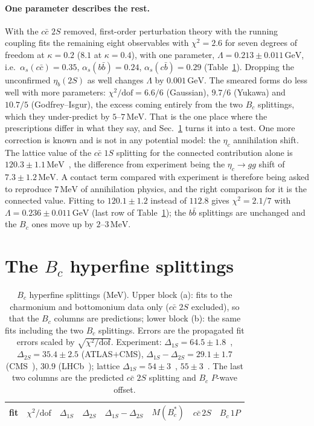 \documentclass[10pt,twocolumn]{article}
\newcommand{\Bc}{B_c}
\newcommand{\Bcs}{B_c^*}
\newcommand{\cc}{c\bar c}
\newcommand{\bb}{b\bar b}
\newcommand{\cb}{c\bar b}
\newcommand{\MeV}{\,\mathrm{MeV}}
\newcommand{\GeV}{\,\mathrm{GeV}}
\begin{document}
\paragraph{One parameter describes the rest.}
With the $\cc$ $2S$ removed, first-order perturbation theory with the running coupling fits the remaining eight observables with $\chi^2=2.6$ for seven degrees of freedom at $\kappa=0.2$ ($8.1$ at $\kappa=0.4$), with one parameter, $\Lambda=0.213\pm0.011\GeV$, i.e.\ $\alpha_s(\cc)=0.35$, $\alpha_s(\bb)=0.24$, $\alpha_s(\cb)=0.29$ (Table~\ref{tab:bc}).
Dropping the unconfirmed $\eta_b(2S)$ as well changes $\Lambda$ by $0.001\GeV$.
The smeared forms do less well with more parameters: $\chi^2/\mathrm{dof}=6.6/6$ (Gaussian), $9.7/6$ (Yukawa) and $10.7/5$ (Godfrey--Isgur), the excess coming entirely from the two $\Bc$ splittings, which they under-predict by $5$--$7\MeV$.
That is the one place where the prescriptions differ in what they say, and Sec.~\ref{sec:bc} turns it into a test.
One more correction is known and is not in any potential model: the $\eta_c$ annihilation shift.
The lattice value of the $\cc$ $1S$ splitting for the connected contribution alone is $120.3\pm1.1\MeV$~\cite{Hatton2020}, the difference from experiment being the $\eta_c\to gg$ shift of $7.3\pm1.2\MeV$.
A contact term compared with experiment is therefore being asked to reproduce $7\MeV$ of annihilation physics, and the right comparison for it is the connected value.
Fitting to $120.1\pm1.2$ instead of $112.8$ gives $\chi^2=2.1/7$ with $\Lambda=0.236\pm0.011\GeV$ (last row of Table~\ref{tab:bc}); the $\bb$ splittings are unchanged and the $\Bc$ ones move up by $2$--$3\MeV$.

\section{The $\Bc$ hyperfine splittings}
\label{sec:bc}

\begin{table}[t]
\caption{$\Bc$ hyperfine splittings (MeV). Upper block (a): fits to the charmonium and bottomonium data only ($\cc$ $2S$ excluded), so that the $\Bc$ columns are predictions; lower block (b): the same fits including the two $\Bc$ splittings. Errors are the propagated fit errors scaled by $\sqrt{\chi^2/\mathrm{dof}}$. Experiment: $\Delta_{1S}=64.5\pm1.8$~\cite{ATLAS2026}, $\Delta_{2S}=35.4\pm2.5$ (ATLAS$+$CMS), $\Delta_{1S}-\Delta_{2S}=29.1\pm1.7$ (CMS~\cite{CMS2019}), $30.9$ (LHCb~\cite{LHCb2019}); lattice $\Delta_{1S}=54\pm3$~\cite{Dowdall2012}, $55\pm3$~\cite{Mathur2018}. The last two columns are the predicted $\cc$ $2S$ splitting and $\Bc$ $P$-wave offset.}
\label{tab:bc}
\centering\small
\begin{tabular}{lccccccc}
\toprule
fit & $\chi^2/\mathrm{dof}$ & $\Delta_{1S}$ & $\Delta_{2S}$ & $\Delta_{1S}-\Delta_{2S}$ & $M(\Bcs)$ & $c\bar c\,2S$ & $B_c\,1P$ \\
\midrule

\end{tabular}
\end{table}
\end{document}
